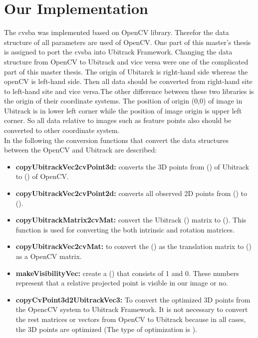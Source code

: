 \section{Our Implementation}
The cvsba was implemented based on OpenCV library. Therefor the data structure of all parameters are used of OpenCV. One part of this master's thesis is assigned to port the cvsba into Ubitrack Framework. Changing the data structure from OpenCV to Ubitrack and vice versa were one of the complicated part of this master thesis. The origin of Ubitarck is right-hand side whereas the openCV is left-hand side. Then all data should be converted from right-hand site to left-hand site and vice versa.The other difference between these two libraries is the origin of their coordinate systems. The position of origin (0,0) of image in Ubitrack is in lower left corner while the position of image origin is upper left corner. So all data relative to images such as feature points also should be converted to other coordinate system.\\
In the following the conversion functions that convert the data structures between the OpenCV and Ubitrack are described:
\begin{itemize}
\item \textbf{copyUbitrackVec2cvPoint3d:} converts the 3D points from  () of Ubitrack to () of OpenCV. 
\item \textbf{copyUbitrackVec2cvPoint2d:} converts all observed 2D points from () to ().
\item \textbf{copyUbitrackMatrix2cvMat:} convert the Ubitrack () matrix to (). This function is used for converting the both intrinsic and rotation matrices.
\item \textbf{copyUbitrackVec2cvMat:} to convert the () as the translation matrix to () as a OpenCV matrix.
\item \textbf{makeVisibilityVec:} create a () that consists of 1 and 0. These numbers represent that a relative projected point is visible in our image or no.
\item \textbf{copyCvPoint3d2UbitrackVec3:} To convert the optimized 3D points from the OpencCV system to Ubitrack Framework. It is not necessary to convert the rest matrices or vectors from OpenCV to Ubitrack because in all cases, the 3D points are optimized (The type of optimization is ).
\end{itemize}


